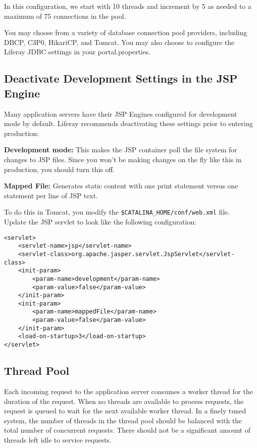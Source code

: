 In this configuration, we start with 10 threads and increment by 5 as
needed to a maximum of 75 connections in the pool.

You may choose from a variety of database connection pool providers,
including DBCP, C3P0, HikariCP, and Tomcat. You may also choose to
configure the Liferay JDBC settings in your portal.properties.

\subsection{Deactivate Development Settings in the JSP
Engine}\label{deactivate-development-settings-in-the-jsp-engine}

Many application servers have their JSP Engines configured for
development mode by default. Liferay recommends deactivating these
settings prior to entering production:

\textbf{Development mode:} This makes the JSP container poll the file
system for changes to JSP files. Since you won't be making changes on
the fly like this in production, you should turn this off.

\textbf{Mapped File:} Generates static content with one print statement
versus one statement per line of JSP text.

To do this in Tomcat, you modify the
\texttt{\$CATALINA\_HOME/conf/web.xml} file. Update the JSP servlet to
look like the following configuration:

\begin{verbatim}
<servlet>   
    <servlet-name>jsp</servlet-name>
    <servlet-class>org.apache.jasper.servlet.JspServlet</servlet-class>   
    <init-param>    
        <param-name>development</param-name>    
        <param-value>false</param-value>   
    </init-param>   
    <init-param>    
        <param-name>mappedFile</param-name>    
        <param-value>false</param-value>   
    </init-param>   
    <load-on-startup>3</load-on-startup> 
</servlet>
\end{verbatim}

\subsection{Thread Pool}\label{thread-pool}

Each incoming request to the application server consumes a worker thread
for the duration of the request. When no threads are available to
process requests, the request is queued to wait for the next available
worker thread. In a finely tuned system, the number of threads in the
thread pool should be balanced with the total number of concurrent
requests. There should not be a significant amount of threads left idle
to service requests.

